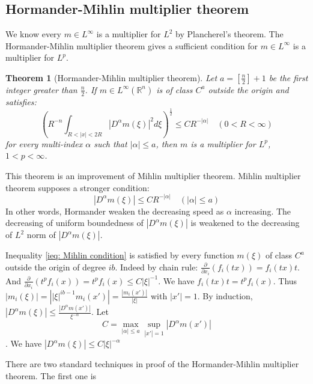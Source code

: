 \documentclass{report}
\theoremstyle{definition}
\theoremstyle{definition}
\theoremstyle{plain}
\newtheorem{theorem}{Theorem}
\numberwithin{theorem}{subsection}
\numberwithin{remark}{subsection}
\newcommand{\abs}[1]{\left\lvert#1\right\rvert}
\begin{document}
\subsection{Hormander-Mihlin multiplier theorem}
We know every $m\in L^\infty$ is a multiplier for $L^2$ by Plancherel's theorem. The Hormander-Mihlin multiplier theorem gives a
sufficient condition for $m\in L^\infty$ is a multiplier for $L^p$.
\begin{theorem}[Hormander-Mihlin multiplier theorem]
    Let $a=[\frac{n}{2}]+1$ be the first integer greater than $\frac{n}{2}$. If $m\in L^\infty(\mathbb{R}^n)$ is of class $C^a$ outside the origin
    and satisfies:
    \begin{equation}\label{hypothesis of H-M multiplier theorem}
        (R^{-n}\int_{R<\abs{x}<2R}\abs{D^\alpha m(\xi)}^2d\xi)^{\frac{1}{2}}\leq CR^{-\abs{\alpha}}\quad (0<R<\infty)
    \end{equation}
    for every multi-index $\alpha$ such that $\abs{\alpha}\leq a$, then $m$ is a multiplier for $L^{p}$, $1<p<\infty$.
\end{theorem}
This theorem is an improvement of Mihlin multiplier theorem. Mihlin multiplier theorem supposes a
stronger condition:
\begin{equation}\label{ieq: Mihlin condition}
    \abs{D^\alpha m(\xi)}\leq CR^{-\abs{\alpha}}\quad (\abs{\alpha}\leq a)
\end{equation}
In other words, Hormander weaken the decreasing speed as $\alpha$ increasing. The decreasing of  uniform boundedness of $\abs{D^\alpha m(\xi)}$ is weakened to the decreasing of $L^{2}$ norm of $\abs{D^\alpha m(\xi)}$.\par
Inequality \eqref{ieq: Mihlin condition} is satisfied by every function $m(\xi)$ of class $C^{a}$ outside the origin of degree $ib$.
Indeed by chain rule: $\frac{\partial}{\partial x_i}(f_i(tx))=f_i(tx)t$. And $\frac{\partial}{\partial x_i}(t^pf_i(x))=t^pf_i(x)\leq C\abs{\xi}^{-1}$. We have
$f_i(tx)t=t^pf_i(x)$. Thus $\abs{m_i(\xi)}=\abs{\abs{\xi}^{ib-1}m_i(x')}=\frac{\abs{m_i(x')}}{\abs{\xi}}$ with $\abs{x'}=1$.
By induction, $\abs{D^\alpha m(\xi)}\leq \frac{\abs{D^\alpha m(x')}}{\xi^{-\alpha}}$. Let
\begin{equation*}
    C=\max_{\abs{\alpha}\leq a}\sup_{\abs{x'}=1}\abs{D^\alpha m(x')}
\end{equation*}
. We have $\abs{D^\alpha m(\xi)}\leq C\abs{\xi}^{-\alpha}$\par
There are two standard techniques in proof of the Hormander-Mihlin multiplier theorem. The first one is
\end{document}
